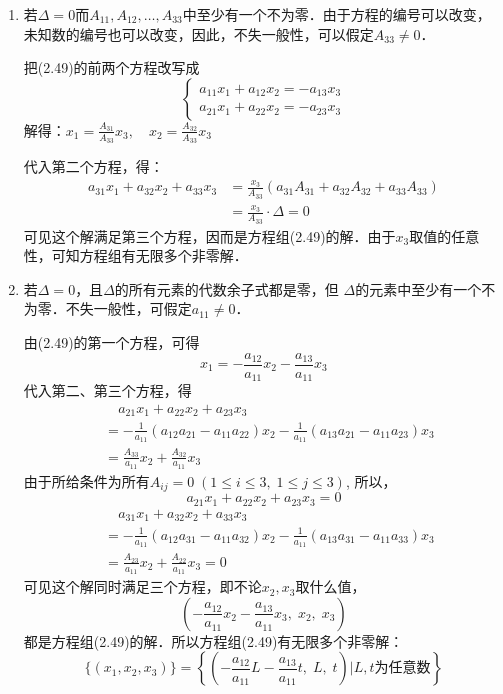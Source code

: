 \begin{enumerate}
    \item 若$\Delta=0$而$A_{11},A_{12},\ldots,A_{33}$中至少有一个不为零．由于方程的编号可以改变，未知数的编号也可以改变，因此，不失一般性，可以假定$A_{33}\ne 0$．
    
    把(2.49)的前两个方程改写成
\[\begin{cases}
    a_{11}x_1+a_{12}x_2=-a_{13}x_3\\
    a_{21}x_1+a_{22}x_2=-a_{23}x_3
\end{cases}\]
解得：$x_1=\frac{A_{31}}{A_{33}}x_3,\quad x_2=\frac{A_{32}}{A_{33}}x_3$

代入第二个方程，得：
\[\begin{split}
    a_{31}x_1+a_{32}x_2+a_{33}x_3&=\frac{x_3}{A_{33}}(a_{31}A_{31}+a_{32}A_{32}+a_{33}A_{33})\\
    &=\frac{x_3}{A_{33}}\cdot \Delta =0
\end{split}\]
可见这个解满足第三个方程，因而是方程组(2.49)的解．由于$x_3$取值的任意性，可知方程组有无限多个非零解．

\item 若$\Delta=0$，且$\Delta$的所有元素的代数余子式都是零，但
$\Delta$的元素中至少有一个不为零．不失一般性，可假定$a_{11}\ne 0$．

由(2.49)的第一个方程，可得
\[x_1=-\frac{a_{12}}{a_{11}}x_2-\frac{a_{13}}{a_{11}}x_3\]
代入第二、第三个方程，得
\[\begin{split}
   &\quad  a_{21}x_1+a_{22}x_2+a_{23}x_3\\
   &=-\frac{1}{a_{11}}(a_{12}a_{21}-a_{11}a_{22})x_2-\frac{1}{a_{11}}(a_{13}a_{21}-a_{11}a_{23})x_3\\
   &=\frac{A_{33}}{a_{11}}x_2+\frac{A_{32}}{a_{11}}x_3
\end{split}\]
由于所给条件为所有$A_{ij}=0\; (1\le i\le 3,\;  1\le j\le 3)$, 所以，
\[a_{21}x_1+a_{22}x_2+a_{23}x_3=0\]
\[\begin{split}
    &\quad a_{31}x_1+a_{32}x_2+a_{33}x_3\\
&=-\frac{1}{a_{11}}(a_{12}a_{31}-a_{11}a_{32})x_2-\frac{1}{a_{11}}(a_{13}a_{31}-a_{11}a_{33})x_3\\
&=\frac{A_{23}}{a_{11}}x_2+\frac{A_{22}}{a_{11}}x_3=0
\end{split}\]
可见这个解同时满足三个方程，即不论$x_2,x_3$取什么值，$$\left(-\frac{a_{12}}{a_{11}}x_2-\frac{a_{13}}{a_{11}}x_3,\; x_2,\; x_3\right)$$
都是方程组(2.49)的解．所以方程组(2.49)有无限多个非零解：
\[\{(x_1,x_2,x_3)\}=\left\{\left(-\frac{a_{12}}{a_{11}}L-\frac{a_{13}}{a_{11}}t,\; L,\; t\right)\big| \text{$L,t$为任意数}\right\}\]
\end{enumerate}

